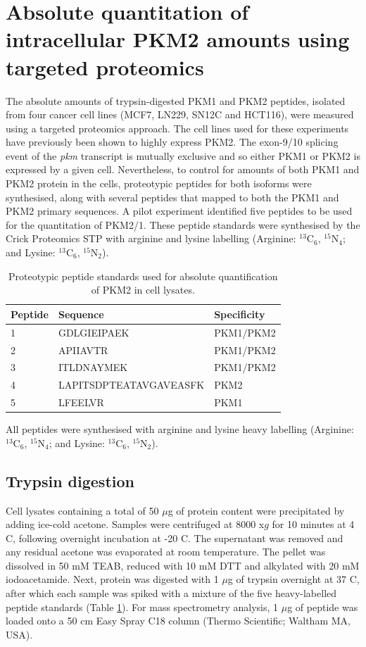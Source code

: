 \section{Absolute quantitation of intracellular PKM2 amounts using targeted proteomics}
The absolute amounts of trypsin-digested PKM1 and PKM2 peptides, isolated from four cancer cell lines (MCF7, LN229, SN12C and HCT116), were measured using a targeted proteomics approach. The cell lines used for these experiments have previously been shown to highly express PKM2. The exon-9/10 splicing event of the \textit{pkm} transcript is mutually exclusive and so either PKM1 or PKM2 is expressed by a given cell. Nevertheless, to control for amounts of both PKM1 and PKM2 protein in the cells, proteotypic peptides for both isoforms were synthesised, along with several peptides that mapped to both the PKM1 and PKM2 primary sequences. A pilot experiment identified five peptides to be used for the quantitation of PKM2/1. These peptide standards were synthesised by the Crick Proteomics STP with arginine and lysine labelling (Arginine: $^{13}$C$_6$, $^{15}$N$_{4}$; and Lysine: $^{13}$C$_6$, $^{15}$N$_2$).
%
%
%
%
\begin{table}[!ht]
\begin{tabular}{@{}lll@{}}
\toprule
Peptide & Sequence & Specificity \\ \midrule
1 & GDLGIEIPAEK & PKM1/PKM2 \\
2 & APIIAVTR & PKM1/PKM2 \\
3 & ITLDNAYMEK & PKM1/PKM2 \\
4 & LAPITSDPTEATAVGAVEASFK & PKM2 \\
5 & LFEELVR & PKM1 \\ \bottomrule
\end{tabular}
\caption{Proteotypic peptide standards used for absolute quantification of PKM2 in cell lysates.} {All peptides were synthesised with arginine and lysine heavy labelling (Arginine: $^{13}$C$_6$, $^{15}$N$_{4}$; and Lysine: $^{13}$C$_6$, $^{15}$N$_2$).}
\label{tab:peptides}
\end{table}

\clearpage

\subsection{Trypsin digestion}
Cell lysates containing a total of 50 $\mu$g of protein content were precipitated by adding ice-cold acetone. Samples were centrifuged at 8000 x$g$ for 10 minutes at 4 \textdegree C, following overnight incubation at -20 \textdegree C. The supernatant was removed and any residual acetone was evaporated at room temperature. The pellet was dissolved in 50 mM TEAB, reduced with 10 mM DTT and alkylated with 20 mM iodoacetamide. Next, protein was digested with 1 $\mu$g of trypsin overnight at 37 \textdegree C, after which each sample was spiked with a mixture of the five heavy-labelled peptide standards (Table \ref{tab:peptides}). For mass spectrometry analysis, 1 $\mu$g of peptide was loaded onto a 50 cm Easy Spray C18 column (Thermo Scientific; Waltham MA, USA).


